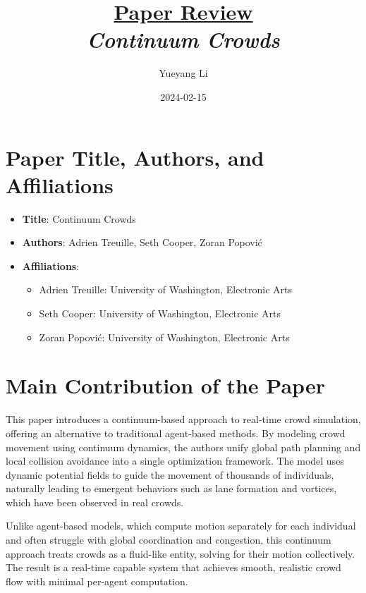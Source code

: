 \documentclass[12pt]{article}
\newcommand{\paperTitle}{
    \textit{\normalsize{Continuum Crowds}}
}
\begin{document}
\title{\Large\uline{\textbf{Paper Review}} \\[0.4em]
\paperTitle{} 
}
\author{Yueyang Li}
\date{2024-02-15}

\maketitle

\section{Paper Title, Authors, and Affiliations}
\begin{itemize}[noitemsep]
    \item \textbf{Title}: Continuum Crowds
    \item \textbf{Authors}: Adrien Treuille, Seth Cooper, Zoran Popović
    \item \textbf{Affiliations}:
    \begin{itemize}[noitemsep]
        \item Adrien Treuille: University of Washington, Electronic Arts
        \item Seth Cooper: University of Washington, Electronic Arts
        \item Zoran Popović: University of Washington, Electronic Arts
    \end{itemize}
\end{itemize}

\section{Main Contribution of the Paper}
This paper introduces a continuum-based approach to real-time crowd simulation, offering an alternative to traditional agent-based methods. By modeling crowd movement using continuum dynamics, the authors unify global path planning and local collision avoidance into a single optimization framework. The model uses dynamic potential fields to guide the movement of thousands of individuals, naturally leading to emergent behaviors such as lane formation and vortices, which have been observed in real crowds.

Unlike agent-based models, which compute motion separately for each individual and often struggle with global coordination and congestion, this continuum approach treats crowds as a fluid-like entity, solving for their motion collectively. The result is a real-time capable system that achieves smooth, realistic crowd flow with minimal per-agent computation.
\end{document}
